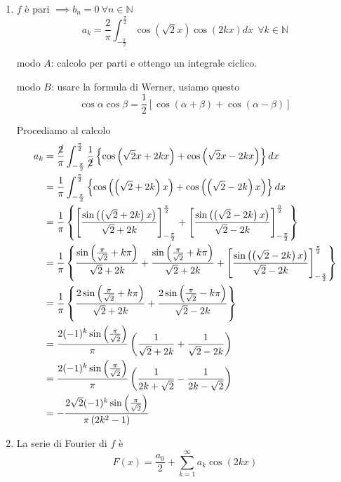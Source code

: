 \begin{enumerate}
\item $f$ è pari $\implies b_{n} =0\ \forall n\in \mathbb{N}$\begin{equation*}
a_{k} =\frac{2}{\pi }\int ^{\frac{\pi }{2}}_{-\frac{\pi }{2}}\cos\left(\sqrt{2} x\right)\cos( 2kx) dx\ \ \forall k\in \mathbb{N}
\end{equation*}

modo $A$: calcolo per parti e ottengo un integrale ciclico.

modo $B$: usare la formula di Werner, usiamo questo\begin{equation*}
\cos \alpha \cos \beta =\frac{1}{2}[\cos( \alpha +\beta ) +\cos( \alpha -\beta )]
\end{equation*}

Procediamo al calcolo\begin{align*}
a_{k} & =\frac{\cancel{2}}{\pi }\int ^{\frac{\pi }{2}}_{-\frac{\pi }{2}}\frac{1}{\cancel{2}}\left\{\cos\left(\sqrt{2} x+2kx\right) +\cos\left(\sqrt{2} x-2kx\right)\right\} dx\\
 & =\frac{1}{\pi }\int ^{\frac{\pi }{2}}_{-\frac{\pi }{2}}\left\{\cos\left(\left(\sqrt{2} +2k\right) x\right) +\cos\left(\left(\sqrt{2} -2k\right) x\right)\right\} dx\\
 & =\frac{1}{\pi }\left\{\left[\frac{\sin\left(\left(\sqrt{2} +2k\right) x\right)}{\sqrt{2} +2k}\right]^{\frac{\pi }{2}}_{-\frac{\pi }{2}} +\left[\frac{\sin\left(\left(\sqrt{2} -2k\right) x\right)}{\sqrt{2} -2k}\right]^{\frac{\pi }{2}}_{-\frac{\pi }{2}}\right\}\\
 & =\frac{1}{\pi }\left\{\frac{\sin\left(\frac{\pi }{\sqrt{2}} +k\pi \right)}{\sqrt{2} +2k} +\frac{\sin\left(\frac{\pi }{\sqrt{2}} +k\pi \right)}{\sqrt{2} +2k} +\left[\frac{\sin\left(\left(\sqrt{2} -2k\right) x\right)}{\sqrt{2} -2k}\right]^{\frac{\pi }{2}}_{-\frac{\pi }{2}}\right\}\\
 & =\frac{1}{\pi }\left\{\frac{2\sin\left(\frac{\pi }{\sqrt{2}} +k\pi \right)}{\sqrt{2} +2k} +\frac{2\sin\left(\frac{\pi }{\sqrt{2}} -k\pi \right)}{\sqrt{2} -2k}\right\}\\
 & =\frac{2( -1)^{k}\sin\left(\frac{\pi }{\sqrt{2}}\right)}{\pi }\left(\frac{1}{\sqrt{2} +2k} +\frac{1}{\sqrt{2} -2k}\right)\\
 & =\frac{2( -1)^{k}\sin\left(\frac{\pi }{\sqrt{2}}\right)}{\pi }\left(\frac{1}{2k+\sqrt{2}} -\frac{1}{2k-\sqrt{2}}\right)\\
 & =-\frac{2\sqrt{2}( -1)^{k}\sin\left(\frac{\pi }{\sqrt{2}}\right)}{\pi \left( 2k^{2} -1\right)}
\end{align*}
\item La serie di Fourier di $f$ è\begin{equation*}
F( x) =\frac{a_{0}}{2} +\sum\limits ^{\infty }_{k=1} a_{k}\cos( 2kx)
\end{equation*}


\end{enumerate}
